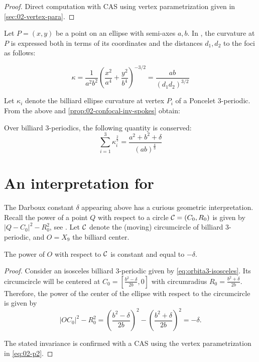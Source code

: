 \begin{proof}
Direct computation with CAS using vertex parametrization given in \cref{sec:02-vertex-para}.
\end{proof}

Let $P=(x,y)$ be a point on an ellipse with semi-axes $a,b$. In \cite[Ellipse]{mw}, the curvature at $P$ is expressed both in terms of its coordinates and the distances $d_1,d_2$ to the foci as follows:

\begin{equation}
\kappa = \frac{1}{a^2 b^2} \left(\frac{x^2}{a^4}+\frac{y^2}{b^4}\right)^{-3/2} = \frac{a b}{(d_1 d_2)^{3/2}}
\label{eqn:02=curv}
\end{equation}

Let $\kappa_i$ denote the billiard ellipse curvature at vertex $P_i$ of a Poncelet 3-periodic. From the above and \cref{prop:02-confocal-inv-spokes} obtain:

\begin{corollary}
Over billiard 3-periodics, the following quantity is conserved:
\[ \sum_{i=1}^3{\kappa_i^\frac{2}{3}} =\frac{ a^2 + b^2 + \delta}{ (ab)^{\frac{4}{3}} }\]
\label{prop:02-confocal-curv-sum}
\end{corollary}

\section{An interpretation for }

The Darboux constant $\delta$ appearing above has a curious geometric interpretation. Recall the power of a point $Q$ with respect to a circle $\mathcal{C}=(C_0,R_0)$ is given by $|Q-C_0|^2-R_0^2$, see \cite[Circle Power]{mw}. Let $\mathcal{C}$ denote the (moving) circumcircle of billiard 3-periodic, and $O=X_9$ the billiard center.

\begin{proposition}
The power of $O$ with respect to $\mathcal{C}$ is constant and equal to $-\delta$.
\label{prop:02-delta}
\end{proposition}

\begin{proof}
Consider an isosceles billiard 3-periodic given by \cref{eq:orbita3-isosceles}.
	Its circumcircle will be centered at $C_0=[ {\frac { {b}^{2}-\delta}{2b}},0]$ with circumradius $R_0=\frac {{b}^{2}+\delta}{2b}.$
	Therefore, the power of the center of the ellipse with respect to the circumcircle is given by  
	$$|OC_0|^2-R_0^2=\left(\frac { {b}^{2}-\delta}{2b}\right)^2 - \left(\frac {{b}^{2}+\delta}{2b}\right)^2=-\delta.$$
	
	The stated invariance is confirmed with a CAS using the vertex parametrization in \cref{eq:02-p2}.  
\end{proof}



